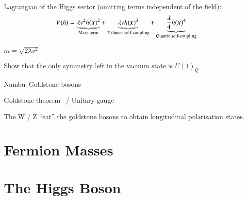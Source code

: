 Lagrangian of the Higgs sector (omitting terms independent of the field):
\begin{align*}
  V(h) =
  \underbrace{\lambda v^2 h(\myvec{x})^2}_{\text{Mass term}}
  +
  \underbrace{\lambda v h(\myvec{x})^3}_{\text{Trilinear self-coupling}}
  +
  \underbrace{\frac{\lambda}{4} h(\myvec{x})^4}_{\text{Quartic self-coupling}}
\end{align*}

$m = \sqrt{2 \lambda v^2}$

Show that the only symmetry left in the vacuum state is $U(1)_Q$

Nambu--Goldstone bosons

Goldstone theorem~\cite{Goldstone:1961eq} / Unitary gauge

The W / Z ``eat'' the goldstone bosons to obtain longitudinal polarisation
states.





\section{Fermion Masses}

\section{The Higgs Boson}


\clearpage

